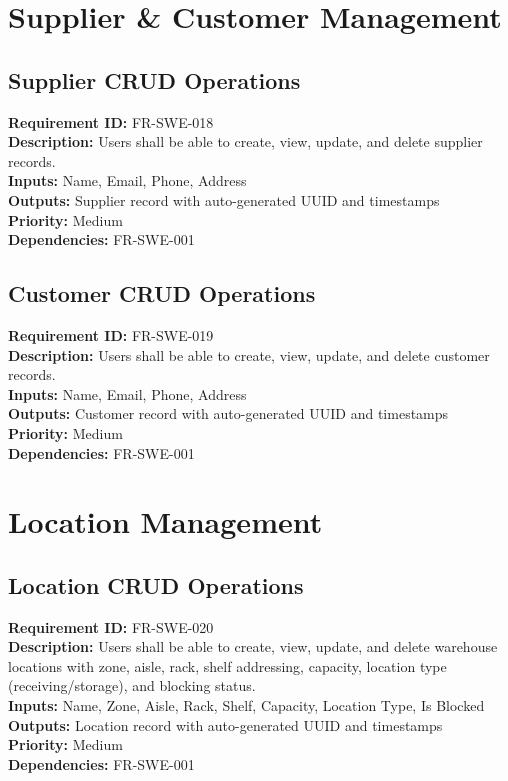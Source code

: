 \documentclass[12pt,a4paper]{report}
\begin{document}
\section{Supplier \& Customer Management}

\subsection{Supplier CRUD Operations}
\noindent\textbf{Requirement ID:} FR-SWE-018\\
\textbf{Description:} Users shall be able to create, view, update, and delete supplier records.\\
\textbf{Inputs:} Name, Email, Phone, Address\\
\textbf{Outputs:} Supplier record with auto-generated UUID and timestamps\\
\textbf{Priority:} Medium\\
\textbf{Dependencies:} FR-SWE-001

\subsection{Customer CRUD Operations}
\noindent\textbf{Requirement ID:} FR-SWE-019\\
\textbf{Description:} Users shall be able to create, view, update, and delete customer records.\\
\textbf{Inputs:} Name, Email, Phone, Address\\
\textbf{Outputs:} Customer record with auto-generated UUID and timestamps\\
\textbf{Priority:} Medium\\
\textbf{Dependencies:} FR-SWE-001

\section{Location Management}

\subsection{Location CRUD Operations}
\noindent\textbf{Requirement ID:} FR-SWE-020\\
\textbf{Description:} Users shall be able to create, view, update, and delete warehouse locations with zone, aisle, rack, shelf addressing, capacity, location type (receiving/storage), and blocking status.\\
\textbf{Inputs:} Name, Zone, Aisle, Rack, Shelf, Capacity, Location Type, Is Blocked\\
\textbf{Outputs:} Location record with auto-generated UUID and timestamps\\
\textbf{Priority:} Medium\\
\textbf{Dependencies:} FR-SWE-001
\end{document}

